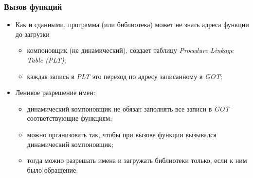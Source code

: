 \begin{frame}
\frametitle{Вызов функций}
\begin{itemize}
  \item<1-> Как и сданными, программа (или библиотека) может не знать адреса функции до загрузки
    \begin{itemize}
      \item компоновщик (не динамический), создает таблицу \emph{Procedure Linkage Table (PLT)};
      \item каждая запись в \emph{PLT} это переход по адресу записанному в \emph{GOT};
    \end{itemize}
  \item<2-> Ленивое разрешение имен:
    \begin{itemize}
      \item динамический компоновщик не обязан заполнять все записи в \emph{GOT} соответствующие функциям;
      \item можно организовать так, чтобы при вызове функции вызывался динамический компоновщик;
      \item тогда можно разрешать имена и загружать библиотеки только, если к ним было обращение;
    \end{itemize}
\end{itemize}
\end{frame}
